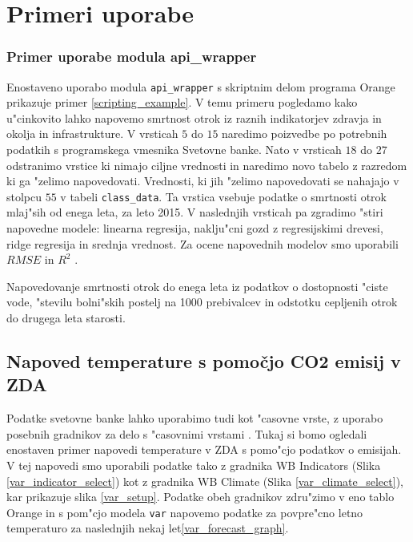 \chapter{Primeri uporabe}




\subsection{Primer uporabe modula api\_wrapper}

Enostaveno uporabo modula \verb|api_wrapper| s skriptnim delom programa Orange
prikazuje primer \ref{scripting_example}. V temu primeru pogledamo kako
u"cinkovito lahko napovemo smrtnost otrok iz raznih indikatorjev zdravja in
okolja in infrastrukture. V vrsticah $5$ do $15$ naredimo poizvedbe po
potrebnih podatkih s programskega vmesnika Svetovne banke. Nato v vrsticah $18$
do $27$ odstranimo vrstice ki nimajo ciljne vrednosti in naredimo novo tabelo z
razredom ki ga "zelimo napovedovati. Vrednosti, ki jih "zelimo napovedovati se
nahajajo v stolpcu $55$ v tabeli \verb|class_data|. Ta vrstica vsebuje podatke
o smrtnosti otrok mlaj"sih od enega leta, za leto 2015. V naslednjih vrsticah
pa zgradimo "stiri napovedne modele: linearna regresija, naklju"cni gozd z
regresijskimi drevesi, ridge regresija in srednja vrednost. Za ocene napovednih
modelov smo uporabili
$RMSE$  in 
$R^2$ .


\begin{snippet}
\begin{center}

\end{center}
\cprotect
\caption{Napovedovanje smrtnosti otrok do enega leta iz podatkov o dostopnosti
  "ciste vode, "stevilu bolni"skih postelj na 1000 prebivalcev in odstotku
  cepljenih otrok do drugega leta starosti.}
\label{scripting_example}
\end{snippet} 



\section{Napoved temperature s pomočjo CO2 emisij v ZDA}


Podatke svetovne banke lahko uporabimo tudi kot "casovne vrste, z uporabo
posebnih gradnikov za delo s "casovnimi vrstami \cite{time_series}. Tukaj si
bomo ogledali enostaven primer napovedi temperature v ZDA s pomo"cjo podatkov o
emisijah. V tej napovedi smo uporabili podatke tako z gradnika WB Indicators
(Slika \ref{var_indicator_select})
kot z gradnika WB Climate (Slika \ref{var_climate_select}), 
kar prikazuje slika \ref{var_setup}. Podatke obeh gradnikov zdru"zimo v eno 
tablo Orange in s pom"cjo modela \verb|var| napovemo podatke za povpre"cno 
letno temperaturo za naslednjih nekaj let\ref{var_forecast_graph}.

